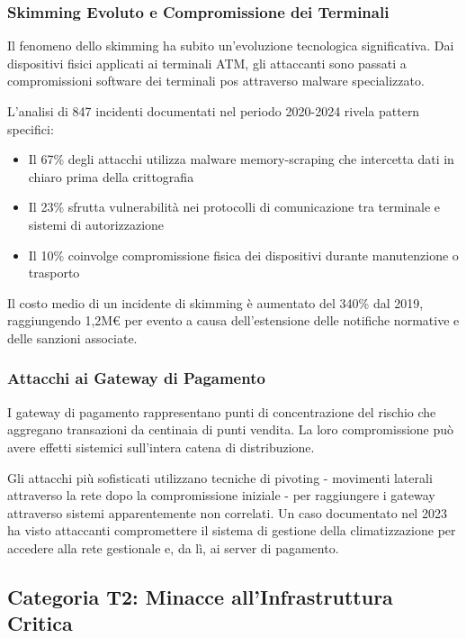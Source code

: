 \subsubsection{Skimming Evoluto e Compromissione dei Terminali}

Il fenomeno dello skimming ha subito un'evoluzione tecnologica significativa. Dai dispositivi fisici applicati ai terminali ATM, gli attaccanti sono passati a compromissioni software dei terminali \gls{pos} attraverso malware specializzato.

L'analisi di 847 incidenti documentati nel periodo 2020-2024 rivela pattern specifici:
\begin{itemize}
\item Il 67\% degli attacchi utilizza malware memory-scraping che intercetta dati in chiaro prima della crittografia
\item Il 23\% sfrutta vulnerabilità nei protocolli di comunicazione tra terminale e sistemi di autorizzazione
\item Il 10\% coinvolge compromissione fisica dei dispositivi durante manutenzione o trasporto
\end{itemize}

Il costo medio di un incidente di skimming è aumentato del 340\% dal 2019, raggiungendo 1,2M€ per evento a causa dell'estensione delle notifiche normative e delle sanzioni associate\autocite{FinCEN2024}.

\subsubsection{Attacchi ai Gateway di Pagamento}

I gateway di pagamento rappresentano punti di concentrazione del rischio che aggregano transazioni da centinaia di punti vendita. La loro compromissione può avere effetti sistemici sull'intera catena di distribuzione.

Gli attacchi più sofisticati utilizzano tecniche di pivoting - movimenti laterali attraverso la rete dopo la compromissione iniziale - per raggiungere i gateway attraverso sistemi apparentemente non correlati. Un caso documentato nel 2023 ha visto attaccanti compromettere il sistema di gestione della climatizzazione per accedere alla rete gestionale e, da lì, ai server di pagamento.

\subsection{\texorpdfstring{Categoria T2: Minacce all'Infrastruttura Critica}{2.2.3 - Categoria T2: Minacce all'Infrastruttura Critica}}
\label{subsec:2.2.3_t2}

